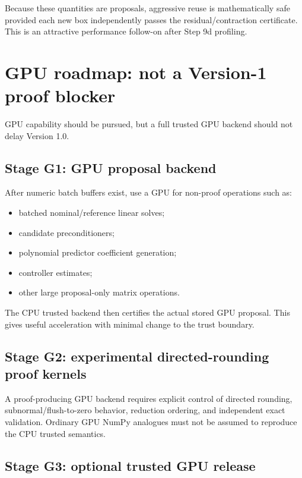 \documentclass[11pt]{article}
\begin{document}
Because these quantities are proposals, aggressive reuse is mathematically safe
provided each new box independently passes the residual/contraction certificate.
This is an attractive performance follow-on after Step 9d profiling.

\section{GPU roadmap: not a Version-1 proof blocker}

GPU capability should be pursued, but a full trusted GPU backend should not delay
Version 1.0.

\subsection{Stage G1: GPU proposal backend}

After numeric batch buffers exist, use a GPU for non-proof operations such as:
\begin{itemize}[leftmargin=*]
\item batched nominal/reference linear solves;
\item candidate preconditioners;
\item polynomial predictor coefficient generation;
\item controller estimates;
\item other large proposal-only matrix operations.
\end{itemize}
The CPU trusted backend then certifies the actual stored GPU proposal.  This gives
useful acceleration with minimal change to the trust boundary.

\subsection{Stage G2: experimental directed-rounding proof kernels}

A proof-producing GPU backend requires explicit control of directed rounding,
subnormal/flush-to-zero behavior, reduction ordering, and independent exact
validation.  Ordinary GPU NumPy analogues must not be assumed to reproduce the
CPU trusted semantics.

\subsection{Stage G3: optional trusted GPU release}
\end{document}
